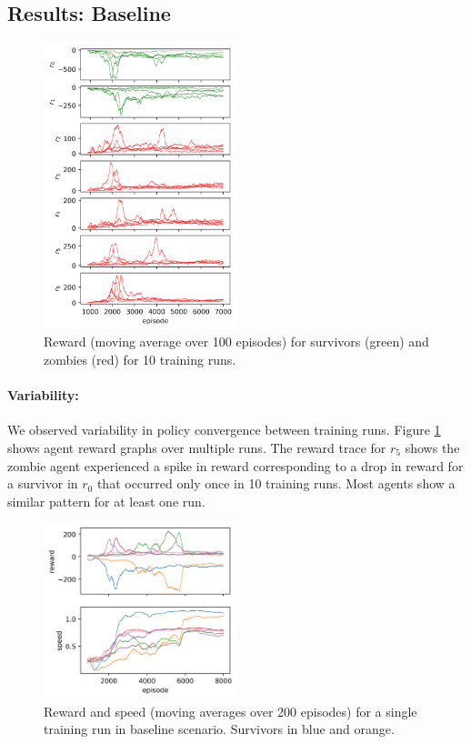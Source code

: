 \documentclass[11pt,a4paper]{article}
\begin{document}
\subsection{Results: Baseline}

\begin{figure}
  \centering
  \includegraphics[width=0.5\textwidth]{figures/baseline_reward.png}
  \caption{Reward (moving average over 100 episodes) for survivors (green) and zombies (red) for 10 training runs.}
  \label{fig:baseline_reward}
\end{figure}

\paragraph{Variability:} We observed variability in policy convergence between training runs.
Figure \ref{fig:baseline_reward} shows agent reward graphs over multiple runs.
The reward trace for $r_5$ shows the zombie agent experienced a spike in reward corresponding to a drop in reward for a survivor in $r_0$
that occurred only once in 10 training runs.
Most agents show a similar pattern for at least one run.

\begin{figure}
  \centering
  \includegraphics[width=0.5\textwidth]{figures/baseline_speed.png}
  \caption{Reward and speed (moving averages over 200 episodes) for a single training run in baseline scenario. Survivors in blue and orange.}
  \label{fig:baseline_speed}
\end{figure}
\end{document}
